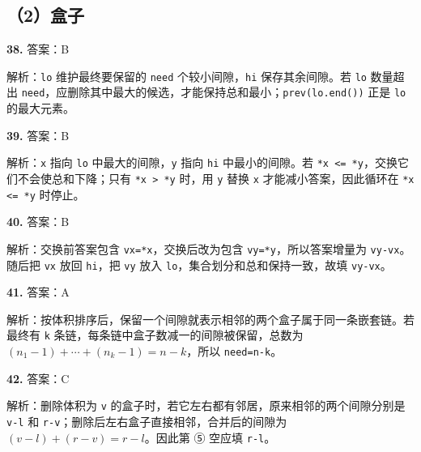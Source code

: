 \documentclass[a4paper]{ctexart}
\newcommand{\ans}[2]{\noindent\textbf{#1} \quad 答案：#2\par}
\newcommand{\expn}[1]{\hspace*{1.5em}解析：#1\par}
\begin{document}
\subsection*{（2）盒子}
\ans{38.}{B}\expn{\texttt{lo} 维护最终要保留的 \texttt{need} 个较小间隙，\texttt{hi} 保存其余间隙。若 \texttt{lo} 数量超出 \texttt{need}，应删除其中最大的候选，才能保持总和最小；\texttt{prev(lo.end())} 正是 \texttt{lo} 的最大元素。}
\ans{39.}{B}\expn{\texttt{x} 指向 \texttt{lo} 中最大的间隙，\texttt{y} 指向 \texttt{hi} 中最小的间隙。若 \texttt{*x <= *y}，交换它们不会使总和下降；只有 \texttt{*x > *y} 时，用 \texttt{y} 替换 \texttt{x} 才能减小答案，因此循环在 \texttt{*x <= *y} 时停止。}
\ans{40.}{B}\expn{交换前答案包含 \texttt{vx=*x}，交换后改为包含 \texttt{vy=*y}，所以答案增量为 \texttt{vy-vx}。随后把 \texttt{vx} 放回 \texttt{hi}，把 \texttt{vy} 放入 \texttt{lo}，集合划分和总和保持一致，故填 \texttt{vy-vx}。}
\ans{41.}{A}\expn{按体积排序后，保留一个间隙就表示相邻的两个盒子属于同一条嵌套链。若最终有 \texttt{k} 条链，每条链中盒子数减一的间隙被保留，总数为 $(n_1-1)+\cdots+(n_k-1)=n-k$，所以 \texttt{need=n-k}。}
\ans{42.}{C}\expn{删除体积为 \texttt{v} 的盒子时，若它左右都有邻居，原来相邻的两个间隙分别是 \texttt{v-l} 和 \texttt{r-v}；删除后左右盒子直接相邻，合并后的间隙为 $(v-l)+(r-v)=r-l$。因此第 ⑤ 空应填 \texttt{r-l}。}
\end{document}
